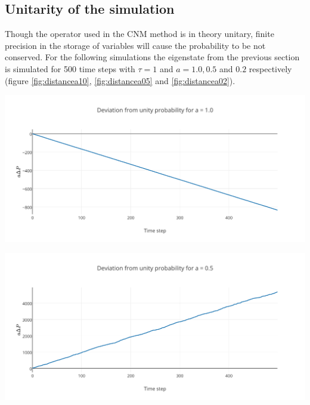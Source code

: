 \subsection*{Unitarity of the simulation}
Though the operator used in the CNM method is in theory unitary, finite precision in the storage of variables will cause the probability to be not conserved. For the following simulations the eigenstate from the previous section is simulated for 500 time steps with $\tau = 1$ and $a = 1.0, 0.5$ and $0.2$ respectively (figure \ref{fig:distancea10}, \ref{fig:distancea05} and \ref{fig:distancea02}).
\begin{Figure}
    \centering
    \includegraphics[width=\linewidth]{norma10.pdf}
    \label{fig:distancea10}
\end{Figure}
\begin{Figure}
    \centering
    \includegraphics[width=\linewidth]{norma05.pdf}
    \label{fig:distancea05}
\end{Figure}
